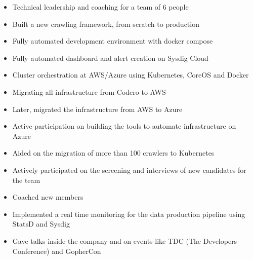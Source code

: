 \documentclass[]{friggeri-cv} %
\begin{document}
\begin{entrylist}
{\begin{itemize}
    \item Technical leadership and coaching for a team of 6 people
    \item Built a new crawling framework, from scratch to production
    \item Fully automated development environment with docker compose
    \item Fully automated dashboard and alert creation on Sysdig Cloud
    \item Cluster orchestration at AWS/Azure using Kubernetes, CoreOS and Docker
    \item Migrating all infrastructure from Codero to AWS
    \item Later, migrated the infrastructure from AWS to Azure
    \item Active participation on building the tools to automate infrastructure on Azure
    \item Aided on the migration of more than 100 crawlers to Kubernetes
    \item Actively participated on the screening and interviews of new candidates for the team
    \item Coached new members
    \item Implemented a real time monitoring for the data production pipeline using StatsD and Sysdig
    \item Gave talks inside the company and on events like TDC (The Developers Conference) and GopherCon
\end{itemize}
}
\end{entrylist}
\end{document}
